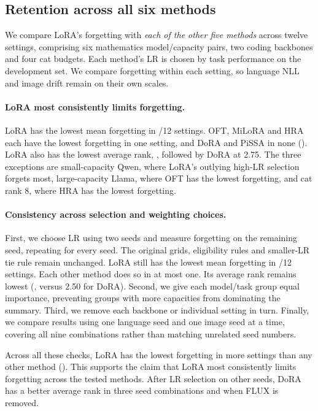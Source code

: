 \subsection{Retention across all six methods}\label{app:retention-patterns}

We compare LoRA's forgetting with \emph{each of the other five methods} across twelve settings, comprising six mathematics model/capacity pairs, two coding backbones and four cat budgets. Each method's LR is chosen by task performance on the development set. We compare forgetting within each setting, so language NLL and image drift remain on their own scales.

\paragraph{LoRA most consistently limits forgetting.}
LoRA has the lowest mean forgetting in /12 settings. OFT, MiLoRA and HRA each have the lowest forgetting in one setting, and DoRA and PiSSA in none (). LoRA also has the lowest average rank, , followed by DoRA at 2.75. The three exceptions are small-capacity Qwen, where LoRA's outlying high-LR selection forgets most, large-capacity Llama, where OFT has the lowest forgetting, and cat rank 8, where HRA has the lowest forgetting.



\paragraph{Consistency across selection and weighting choices.}
First, we choose LR using two seeds and measure forgetting on the remaining seed, repeating for every seed. The original grids, eligibility rules and smaller-LR tie rule remain unchanged. LoRA still has the lowest mean forgetting in /12 settings. Each other method does so in at most one. Its average rank remains lowest (, versus 2.50 for DoRA).
Second, we give each model/task group equal importance, preventing groups with more capacities from dominating the summary.
Third, we remove each backbone or individual setting in turn.
Finally, we compare results using one language seed and one image seed at a time, covering all nine combinations rather than matching unrelated seed numbers.

Across all these checks, LoRA has the lowest forgetting in more settings than any other method (). This supports the claim that LoRA most consistently limits forgetting across the tested methods. After LR selection on other seeds, DoRA has a better average rank in three seed combinations and when FLUX is removed.

